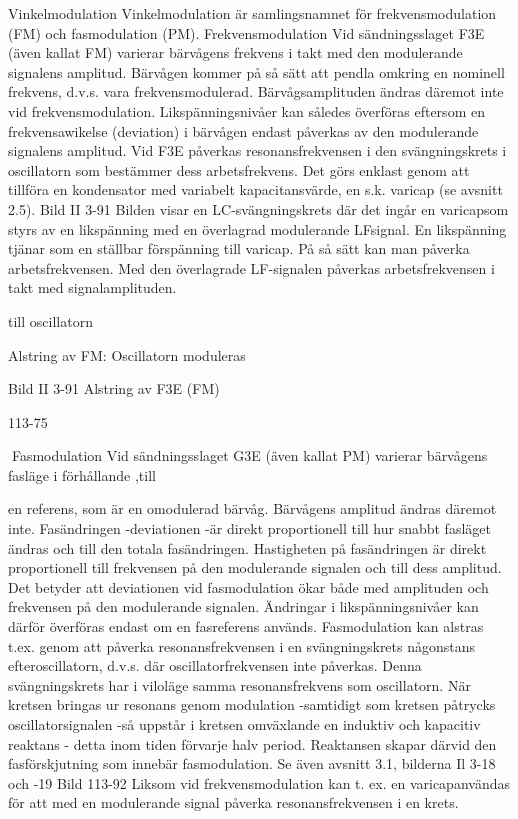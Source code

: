 \documentclass[a4paper,twoside,twocolumn,openright]{book}
\begin{document}
{{{{Vinkelmodulation
Vinkelmodulation är samlingsnamnet för frekvensmodulation (FM) och fasmodulation
(PM).
Frekvensmodulation
Vid sändningsslaget F3E (även kallat FM)
varierar bärvågens frekvens i takt med den
modulerande signalens amplitud. Bärvågen
kommer på så sätt att pendla omkring en
nominell frekvens, d.v.s. vara frekvensmodulerad. Bärvågsamplituden ändras däremot
inte vid frekvensmodulation.
Likspänningsnivåer kan således överföras eftersom en frekvensawikelse (deviation) i bärvågen endast påverkas av den
modulerande signalens amplitud.
Vid F3E påverkas resonansfrekvensen i
den svängningskrets i oscillatorn som bestämmer dess arbetsfrekvens. Det görs enklast genom att tillföra en kondensator med
variabelt kapacitansvärde, en s.k. varicap
(se avsnitt 2.5).
Bild II 3-91
Bilden visar en LC-svängningskrets där
det ingår en varicapsom styrs av en likspänning med en överlagrad modulerande LFsignal. En likspänning tjänar som en ställbar
förspänning till varicap. På så sätt kan man
påverka arbetsfrekvensen. Med den överlagrade LF-signalen påverkas arbetsfrekvensen i takt med signalamplituden.

till oscillatorn

Alstring av FM:
Oscillatorn moduleras

Bild II 3-91 Alstring av F3E (FM)

113-75

Fasmodulation
Vid sändningsslaget G3E (även kallat PM)
varierar bärvågens fasläge i förhållande ,till

en referens, som är en omodulerad bärvåg.
Bärvågens amplitud ändras däremot inte.
Fasändringen -deviationen -är direkt proportionell till hur snabbt fasläget ändras och
till den totala fasändringen. Hastigheten på
fasändringen är direkt proportionell till frekvensen på den modulerande signalen och till
dess amplitud.
Det betyder att deviationen vid fasmodulation ökar både med amplituden och frekvensen på den modulerande signalen. Ändringar i likspänningsnivåer kan därför överföras endast om en fasreferens används.
Fasmodulation kan alstras t.ex. genom
att påverka resonansfrekvensen i en svängningskrets någonstans efteroscillatorn, d.v.s.
där oscillatorfrekvensen inte påverkas. Denna svängningskrets har i viloläge samma
resonansfrekvens som oscillatorn. När kretsen bringas ur resonans genom modulation
-samtidigt som kretsen påtrycks oscillatorsignalen -så uppstår i kretsen omväxlande
en induktiv och kapacitiv reaktans - detta
inom tiden förvarje halv period. Reaktansen
skapar därvid den fasförskjutning som innebär fasmodulation. Se även avsnitt 3.1, bilderna Il 3-18 och -19
Bild 113-92
Liksom vid frekvensmodulation kan t. ex.
en varicapanvändas för att med en modulerande signal påverka resonansfrekvensen i
en krets.

}}}}
\end{document}
